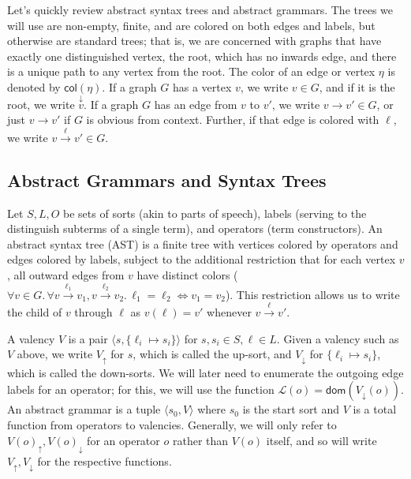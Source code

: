 \documentclass[11pt]{article} %
\theoremstyle{definition}
\newcommand{\Ell}{\mathscr{L}}
\begin{document}
Let's quickly review abstract syntax trees and abstract grammars.
The trees we will use are non-empty, finite, and are colored on both edges and labels, but otherwise are standard trees;
that is, we are concerned with graphs that have exactly one distinguished vertex, the root, which has no inwards edge, and there is a unique path to any vertex from the root.
The color of an edge or vertex $\eta$ is denoted by $\mathsf{col}(\eta)$.
If a graph $G$ has a vertex $v$, we write $v \in G$, and if it is the root, we write $\overset\downarrow v$.
If a graph $G$ has an edge from $v$ to $v'$, we write $v \to v' \in G$, or just $v \to v'$ if $G$ is obvious from context.
Further, if that edge is colored with $\ell$, we write $v \overset{\ell}\to v' \in G$.

\subsection{Abstract Grammars and Syntax Trees}

Let $S, L, O$ be sets of sorts (akin to parts of speech), labels (serving to the distinguish subterms of a single term), and operators (term constructors).
An abstract syntax tree (AST) is a finite tree with vertices colored by operators and edges colored by labels, subject to the additional restriction that for each vertex $v$, all outward edges from $v$ have distinct colors ($\forall v \in G.\,\forall v \overset{\ell_1}\to v_1, v \overset{\ell_2}\to v_2.\,\ell_1 = \ell_2 \Leftrightarrow v_1 = v_2$).
This restriction allows us to write the child of $v$ through $\ell$ as $v(\ell) = v'$ whenever $v \overset{\ell}\to v'$.

A valency $V$ is a pair $\langle s, \{\ell_i \mapsto s_i\} \rangle$ for $s, s_i \in S, \ell \in L$.
Given a valency such as $V$ above, we write $V_\uparrow$ for $s$, which is called the up-sort, and $V_\downarrow$ for $\{\ell_i \mapsto s_i\}$, which is called the down-sorts.
We will later need to enumerate the outgoing edge labels for an operator; for this, we will use the function $\Ell(o) = \mathsf{dom}(V_\downarrow(o))$.
An abstract grammar is a tuple $\langle s_0, V \rangle$ where $s_0$ is the start sort and $V$ is a total function from operators to valencies.
Generally, we will only refer to $V(o)_\uparrow, V(o)_\downarrow$ for an operator $o$ rather than $V(o)$ itself, and so will write $V_\uparrow, V_\downarrow$ for the respective functions.
\end{document}
